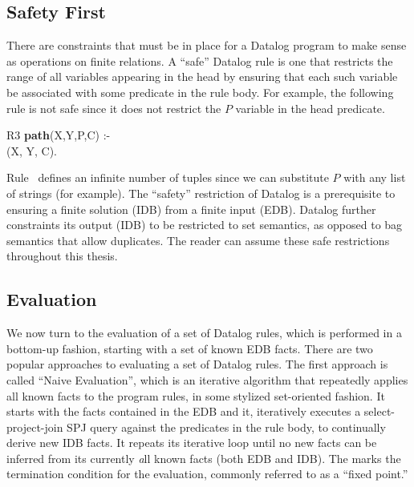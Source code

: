 \subsection{Safety First}

There are constraints that must be in place for a Datalog program to make
sense as operations on finite relations. A ``safe'' Datalog rule is one
that restricts the range of all variables appearing in the head by ensuring
that each such variable be associated with some predicate in the rule body.
For example, the following rule is not safe since it does not restrict the
$P$ variable in the  head predicate.

\begin{minipage}{\linewidth}
\ssp
R3 {\bf path}(X,Y,P,C) :- \\
(X, Y, C). \\
\end{minipage}
Rule~ defines an infinite number of  tuples since we can
substitute $P$ with any list of strings (for example).  The ``safety''
restriction of Datalog is a prerequisite to ensuring a finite solution (IDB)
from a finite input (EDB).  Datalog further constraints its output (IDB) to be
restricted to set semantics, as opposed to bag semantics that allow duplicates.
The reader can assume these safe restrictions throughout this thesis.

\subsection{Evaluation}

We now turn to the evaluation of a set of Datalog rules, which is performed in
a bottom-up fashion, starting with a set of known EDB facts.  There are two
popular approaches to evaluating a set of Datalog rules.  The first approach is
called ``Naive Evaluation'', which is an iterative algorithm that repeatedly
applies all known facts to the program rules, in some stylized set-oriented
fashion.  It starts with the facts contained in the EDB and it, iteratively
executes a select-project-join SPJ query against the predicates in the rule
body, to continually derive new IDB facts.  It repeats its iterative loop until
no new facts can be inferred from its currently {\emph all} known facts (both
EDB and IDB).  The marks the termination condition for the evaluation, commonly
referred to as a ``fixed point.''

